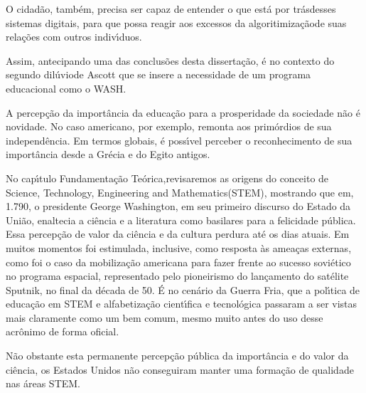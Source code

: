 \documentclass[
12pt,		%
openright,	%
twoside,  %
a4paper,			%
chapter=TITLE,		%
english,			%
french,				%
spanish,			%
brazil				%
]{USPSC-classe/USPSC}
\begin{document}
O cidad\~ao, tamb\'em, precisa ser capaz de entender \textquotedbl o que est\'a por tr\'as\textquotedbl  desses sistemas digitais, para que possa reagir aos excessos da \textquotedbl algoritimiza\c{c}\~ao\textquotedbl  de suas rela\c{c}\~oes com outros indiv\'{\i}duos.








Assim, antecipando  uma das conclus\~oes desta disserta\c{c}\~ao, \'e no contexto do \textquotedbl segundo dil\'uvio\textquotedbl  de Ascott que se insere a necessidade de um programa educacional como o WASH.








A percep\c{c}\~ao da import\^ancia da educa\c{c}\~ao para a prosperidade da sociedade n\~ao \'e novidade. No caso americano, por exemplo, remonta aos prim\'ordios de sua independ\^encia. Em termos globais, \'e poss\'{\i}vel perceber o reconhecimento de sua import\^ancia desde a Gr\'ecia e do Egito antigos.








No cap\'{\i}tulo \textquotedbl Fundamenta\c{c}\~ao Te\'orica,\textquotedbl  revisaremos as origens do conceito de \textquotedbl Science, Technology, Engineering and Mathematics\textquotedbl  (STEM), mostrando que em, 1.790, o presidente George Washington, em seu primeiro discurso do \textquotedbl Estado da Uni\~ao\textquotedbl , enaltecia a ci\^encia e a literatura como  basilares para a \textquotedbl felicidade p\'ublica. Essa percep\c{c}\~ao de valor da ci\^encia e da cultura perdura at\'e os dias atuais. Em muitos momentos foi estimulada, inclusive, como resposta \`as amea\c{c}as externas, como foi o caso da mobiliza\c{c}\~ao americana para fazer frente ao sucesso sovi\'etico no programa espacial, representado pelo pioneirismo do lan\c{c}amento do sat\'elite Sputnik, no final da d\'ecada de 50. \'E no cen\'ario da Guerra Fria, que a pol\'{\i}tica de educa\c{c}\~ao em STEM e alfabetiza\c{c}\~ao cient\'{\i}fica e tecnol\'ogica passaram a ser vistas mais claramente como um bem comum, mesmo muito antes do uso desse acr\^onimo de forma oficial.








N\~ao obstante esta permanente percep\c{c}\~ao p\'ublica da import\^ancia e do valor da ci\^encia, os Estados Unidos n\~ao conseguiram manter uma forma\c{c}\~ao de qualidade nas \'areas STEM.
\end{document}
